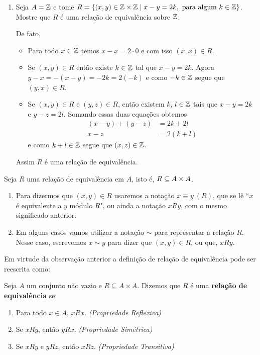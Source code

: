 \begin{exemplos}
\begin{enumerate}[label={\arabic*})]
		\item Seja $A = \mathbb{Z}$ e tome $R = \{(x,y)\in \mathbb{Z} \times \mathbb{Z} \mid x - y = 2k, \mbox{ para algum } k \in \mathbb{Z}\}$. Mostre que $R$
		\'e uma rela{\c c}{\~a}o de equival{\^e}ncia sobre $\mathbb{Z}$.
		\begin{solucao}
			De fato,
			\begin{itemize}
				\item Para todo $x\in\mathbb{Z}$ temos $x - x = 2\cdot0$ e com isso $(x,x) \in R$.
				\item Se $(x,y) \in R$ ent\~ao existe $k \in \mathbb{Z}$ tal que $x - y = 2k$. Agora $y - x = -(x - y) = -2k = 2 (-k)$ 
				e como $-k \in \mathbb{Z}$ segue que $(y,x) \in R$.
				\item Se $(x,y) \in R$ e $(y,z) \in R$, ent\~ao existem $k$, $l\in \mathbb{Z}$ tais que $x - y = 2k$ e $y - z = 2l$.
				Somando essas duas equa\c{c}\~oes obtemos
				\begin{align*}
					(x - y) + (y - z) &= 2k + 2l\\
					x - z &= 2(k + l)
				\end{align*}
				e como $k + l \in \mathbb{Z}$ segue que $(x,z) \in \mathbb{Z}$.
			\end{itemize}
			Assim $R$ \'e uma rela\c{c}\~ao de equival\^encia.
		\end{solucao}
	\end{enumerate}
\end{exemplos}
\begin{observacoes}
	Seja $R$ uma rela{\c c}{\~a}o de equival{\^e}ncia em $A$, isto \'e, $R \subseteq A \times A$.
	\begin{enumerate}[label={\roman*})]
		\item  Para dizermos que $(x,y) \in R$ usaremos a nota{\c c}{\~a}o $x\equiv y\ (R)$, que se l{\^e} ``$x$ \'e equivalente a $y$ m{\'o}dulo $R$", ou ainda a nota{\c c}{\~a}o $xRy$, com o mesmo significado anterior.
		\item Em alguns casos vamos utilizar a nota\c{c}\~ao $\sim$ para representar a rela\c{c}\~ao $R$. Nesse caso, escrevemos $x \sim y$ para dizer que $(x, y) \in R$, ou que, $xRy$.
	\end{enumerate}
\end{observacoes}

Em virtude da observa\c{c}\~ao anterior a defini\c{c}\~ao de rela\c{c}\~ao de equival\^encia pode ser reescrita como:

\begin{definicao}
	Seja $A$ um conjunto n{\~a}o vazio e $R\subseteq A \times A$. Dizemos que $R$ {\'e} uma \textbf{rela{\c c}{\~a}o de equival{\^e}ncia} se:
	\begin{enumerate}[label={\roman*})]
		\item Para todo $x \in A$, $xRx$. \textit{(Propriedade Reflexiva)}
		\item Se $xRy$, ent\~ao $yRx$. \textit{(Propriedade Sim\'etrica)}
		\item Se $xRy$ e $yRz$, ent\~ao $xRz$. \textit{(Propriedade Transitiva)}
	\end{enumerate}
\end{definicao}

